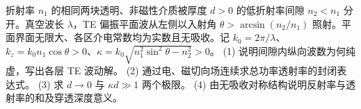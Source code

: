 折射率 \(n_1\) 的相同两块透明、非磁性介质被厚度 \(d>0\) 的低折射率间隙 \(n_2<n_1\) 分开。真空波长 \(\lambda\)，TE 偏振平面波从左侧以入射角 \(\theta>\arcsin(n_2/n_1)\) 照射。平面界面无限大、各区介电常数均为实数且无吸收。记 \(k_0=2\pi/\lambda\)、\(k_z=k_0n_1\cos\theta>0\)、\(\kappa=k_0\sqrt{n_1^2\sin^2\theta-n_2^2}>0\)。
(1) 说明间隙内纵向波数为何纯虚，写出各层 TE 波动解。
(2) 通过电、磁切向场连续求总功率透射率的封闭表达式。
(3) 求 \(d\to0\) 与 \(\kappa d\gg1\) 两个极限。
(4) 由无吸收对称结构说明反射率与透射率的和及穿透深度意义。
